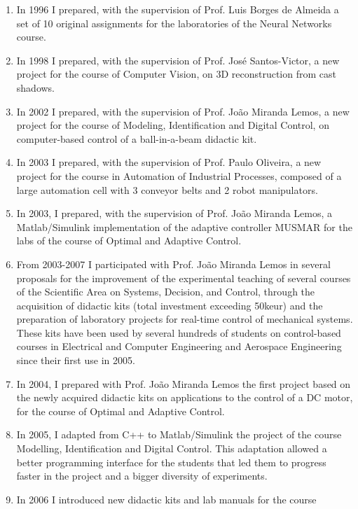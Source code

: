 \begin{enumerate}
\def\labelenumi{\arabic{enumi}.}
\item
  In 1996 I prepared, with the supervision of Prof. Luis Borges de
  Almeida a set of 10 original assignments for the laboratories of the
  Neural Networks course.
\item
  In 1998 I prepared, with the supervision of Prof. José Santos-Victor,
  a new project for the course of Computer Vision, on 3D reconstruction
  from cast shadows.
\item
  In 2002 I prepared, with the supervision of Prof. João Miranda Lemos,
  a new project for the course of Modeling, Identification and Digital
  Control, on computer-based control of a ball-in-a-beam didactic kit.
\item
  In 2003 I prepared, with the supervision of Prof. Paulo Oliveira, a
  new project for the course in Automation of Industrial Processes,
  composed of a large automation cell with 3 conveyor belts and 2 robot
  manipulators.
\item
  In 2003, I prepared, with the supervision of Prof. João Miranda Lemos,
  a Matlab/Simulink implementation of the adaptive controller MUSMAR for
  the labs of the course of Optimal and Adaptive Control.
\item
  From 2003-2007 I participated with Prof. João Miranda Lemos in several
  proposals for the improvement of the experimental teaching of several
  courses of the Scientific Area on Systems, Decision, and Control,
  through the acquisition of didactic kits (total investment exceeding
  50keur) and the preparation of laboratory projects for real-time
  control of mechanical systems. These kits have been used by several
  hundreds of students on control-based courses in Electrical and
  Computer Engineering and Aerospace Engineering since their first use
  in 2005.
\item
  In 2004, I prepared with Prof. João Miranda Lemos the first project
  based on the newly acquired didactic kits on applications to the
  control of a DC motor, for the course of Optimal and Adaptive Control.
\item
  In 2005, I adapted from C++ to Matlab/Simulink the project of the
  course Modelling, Identification and Digital Control. This adaptation
  allowed a better programming interface for the students that led them
  to progress faster in the project and a bigger diversity of
  experiments.
\item
  In 2006 I introduced new didactic kits and lab manuals for the course

\end{enumerate}
